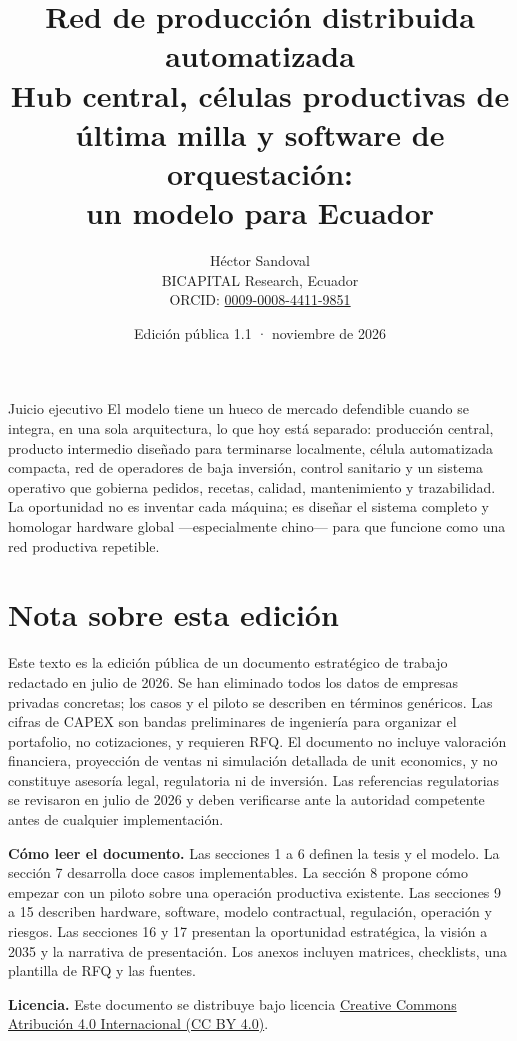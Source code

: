 \documentclass[11pt,a4paper]{article}
\title{Red de producción distribuida automatizada\\[6pt]
\large Hub central, células productivas de última milla y software de orquestación:\\ un modelo para Ecuador}
\author{Héctor Sandoval\\
\small BICAPITAL Research, Ecuador\\
\small ORCID: \href{https://orcid.org/0009-0008-4411-9851}{0009-0008-4411-9851}}
\date{Edición pública 1.1 · noviembre de 2026}
\begin{document}
\maketitle

\begin{caja}{Juicio ejecutivo}
El modelo tiene un hueco de mercado defendible cuando se integra, en una sola arquitectura, lo que hoy
está separado: producción central, producto intermedio diseñado para terminarse localmente, célula
automatizada compacta, red de operadores de baja inversión, control sanitario y un sistema operativo que
gobierna pedidos, recetas, calidad, mantenimiento y trazabilidad. La oportunidad no es inventar cada
máquina; es diseñar el sistema completo y homologar hardware global ---especialmente chino--- para que
funcione como una red productiva repetible.
\end{caja}

\section*{Nota sobre esta edición}
Este texto es la edición pública de un documento estratégico de trabajo redactado en julio de 2026. Se
han eliminado todos los datos de empresas privadas concretas; los casos y el piloto se describen en
términos genéricos. Las cifras de CAPEX son bandas preliminares de ingeniería para organizar el
portafolio, no cotizaciones, y requieren RFQ. El documento no incluye valoración financiera, proyección
de ventas ni simulación detallada de unit economics, y no constituye asesoría legal, regulatoria ni de
inversión. Las referencias regulatorias se revisaron en julio de 2026 y deben verificarse ante la
autoridad competente antes de cualquier implementación.

\noindent\textbf{Cómo leer el documento.} Las secciones 1 a 6 definen la tesis y el modelo. La sección 7
desarrolla doce casos implementables. La sección 8 propone cómo empezar con un piloto sobre una operación
productiva existente. Las secciones 9 a 15 describen hardware, software, modelo contractual, regulación,
operación y riesgos. Las secciones 16 y 17 presentan la oportunidad estratégica, la visión a 2035 y la
narrativa de presentación. Los anexos incluyen matrices, checklists, una plantilla de RFQ y las fuentes.

\noindent\textbf{Licencia.} Este documento se distribuye bajo licencia
\href{https://creativecommons.org/licenses/by/4.0/deed.es}{Creative Commons Atribución 4.0 Internacional (CC BY 4.0)}.
\end{document}
